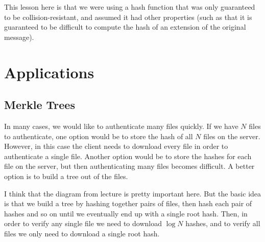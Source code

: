 This lesson here is that we were using a hash function that was only guaranteed to be collision-resistant, and assumed it had other properties (such as that it is guaranteed to be difficult to compute the hash of an extension of the original message).

\section{Applications}
\subsection{Merkle Trees}
In many cases, we would like to authenticate many files quickly. If we have $N$ files to authenticate, one option would be to store the hash of all $N$ files on the server. However, in this case the client needs to download every file in order to authenticate a single file. Another option would be to store the hashes for each file on the server, but then authenticating many files becomes difficult. A better option is to build a tree out of the files. 

I think that the diagram from lecture is pretty important here. But the basic idea is that we build a tree by hashing together pairs of files, then hash each pair of hashes and so on until we eventually end up with a single root hash. Then, in order to verify any single file we need to download $\log N$ hashes, and to verify all files we only need to download a single root hash.

